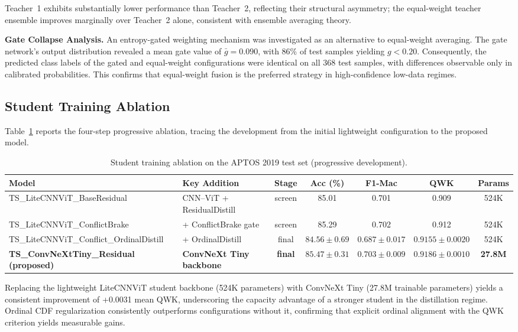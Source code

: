 \documentclass[a4paper,fleqn]{cas-dc}
\begin{document}
Teacher~1 exhibits substantially lower performance than Teacher~2, reflecting their structural asymmetry; the equal-weight teacher ensemble improves marginally over Teacher~2 alone, consistent with ensemble averaging theory.

\textbf{Gate Collapse Analysis.} An entropy-gated weighting mechanism was investigated as an alternative to equal-weight averaging. The gate network's output distribution revealed a mean gate value of $\bar{g} = 0.090$, with 86\% of test samples yielding $g < 0.20$. Consequently, the predicted class labels of the gated and equal-weight configurations were identical on all 368 test samples, with differences observable only in calibrated probabilities. This confirms that equal-weight fusion is the preferred strategy in high-confidence low-data regimes.

\subsection{Student Training Ablation}
\label{sec:ablation}

Table~\ref{tab:ablation} reports the four-step progressive ablation, tracing the development from the initial lightweight configuration to the proposed model.

\begin{table}[t]
\centering
\caption{Student training ablation on the APTOS 2019 test set (progressive development).}
\label{tab:ablation}
\begin{tabular}{llccccc}
\toprule
Model & Key Addition & Stage & Acc (\%) & F1-Mac & QWK & Params \\
\midrule
TS\_LiteCNNViT\_BaseResidual & CNN--ViT + ResidualDistill & screen & 85.01 & 0.701 & 0.909 & 524K \\
TS\_LiteCNNViT\_ConflictBrake & + ConflictBrake gate & screen & 85.29 & 0.702 & 0.912 & 524K \\
TS\_LiteCNNViT\_Conflict\_OrdinalDistill & + OrdinalDistill & final & $84.56 \pm 0.69$ & $0.687 \pm 0.017$ & $0.9155 \pm 0.0020$ & 524K \\
\textbf{TS\_ConvNeXtTiny\_Residual (proposed)} & \textbf{ConvNeXt Tiny backbone} & \textbf{final} & $\mathbf{85.47 \pm 0.31}$ & $\mathbf{0.703 \pm 0.009}$ & $\mathbf{0.9186 \pm 0.0010}$ & \textbf{27.8M} \\
\bottomrule
\end{tabular}
\end{table}

Replacing the lightweight LiteCNNViT student backbone (524K parameters) with ConvNeXt Tiny (27.8M trainable parameters) yields a consistent improvement of +0.0031 mean QWK, underscoring the capacity advantage of a stronger student in the distillation regime. Ordinal CDF regularization consistently outperforms configurations without it, confirming that explicit ordinal alignment with the QWK criterion yields measurable gains.
\end{document}
